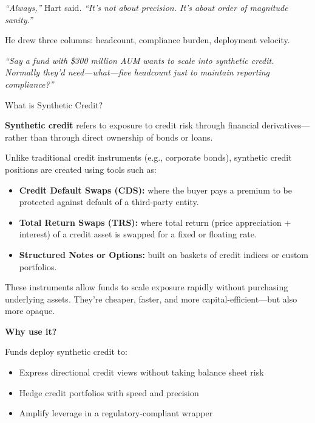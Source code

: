\textit{``Always,''} Hart said. \textit{``It’s not about precision. It’s about order of magnitude sanity.''}

He drew three columns: headcount, compliance burden, deployment velocity.

\textit{``Say a fund with \$300 million AUM wants to scale into synthetic credit. Normally they’d need---what---five headcount 
just to maintain reporting compliance?''}

\medskip

\begin{TechnicalSidebar}{What is Synthetic Credit?}

  \textbf{Synthetic credit} refers to exposure to credit risk through financial derivatives—rather than through direct ownership of bonds or loans.

  \medskip
  
  Unlike traditional credit instruments (e.g., corporate bonds), synthetic credit positions are created using tools such as:

  \medskip
  
  \begin{itemize}
    \item \textbf{Credit Default Swaps (CDS):} where the buyer pays a premium to be protected against default of a third-party entity.
    \item \textbf{Total Return Swaps (TRS):} where total return (price appreciation + interest) of a credit asset is swapped for a fixed or floating rate.
    \item \textbf{Structured Notes or Options:} built on baskets of credit indices or custom portfolios.
  \end{itemize}

  \medskip
  
  These instruments allow funds to scale exposure rapidly without purchasing underlying assets. They're cheaper, faster, and more capital-efficient—but also more opaque.

  \medskip
  
  \textbf{Why use it?}  

  \medskip

  Funds deploy synthetic credit to:

  \medskip
  
  \begin{itemize}
    \item Express directional credit views without taking balance sheet risk
    \item Hedge credit portfolios with speed and precision
    \item Amplify leverage in a regulatory-compliant wrapper
  \end{itemize}


\end{TechnicalSidebar}

